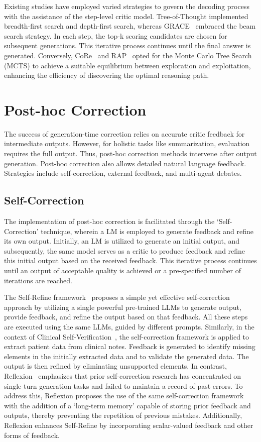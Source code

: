 \documentclass[a4paper,oneside]{book}
\begin{document}
Existing studies have employed varied strategies to govern the decoding process with the assistance of the step-level critic model. Tree-of-Thought implemented breadth-first search and depth-first search, whereas GRACE~\cite{khalifa2023grace} embraced the beam search strategy. In each step, the top-k scoring candidates are chosen for subsequent generations. This iterative process continues until the final answer is generated. Conversely, CoRe~\cite{zhu2022solving} and RAP~\cite{hao2023reasoning} opted for the Monte Carlo Tree Search (MCTS) to achieve a suitable equilibrium between exploration and exploitation, enhancing the efficiency of discovering the optimal reasoning path.

\section{Post-hoc Correction}
The success of generation-time correction relies on accurate critic feedback for intermediate outputs. However, for holistic tasks like summarization, evaluation requires the full output. Thus, post-hoc correction methods intervene after output generation. Post-hoc correction also allows detailed natural language feedback. Strategies include self-correction, external feedback, and multi-agent debates.

\subsection{Self-Correction}
The implementation of post-hoc correction is facilitated through the `Self-Correction' technique, wherein a LM is employed to generate feedback and refine its own output. Initially, an LM is utilized to generate an initial output, and subsequently, the same model serves as a critic to produce feedback and refine this initial output based on the received feedback. This iterative process continues until an output of acceptable quality is achieved or a pre-specified number of iterations are reached.

The Self-Refine framework~\cite{madaan2024self} proposes a simple yet effective self-correction approach by utilizing a single powerful pre-trained LLMs to generate output, provide feedback, and refine the output based on that feedback. All these steps are executed using the same LLMs, guided by different prompts. Similarly, in the context of Clinical Self-Verification~\cite{gero2023selfverification}, the self-correction framework is applied to extract patient data from clinical notes. Feedback is generated to identify missing elements in the initially extracted data and to validate the generated data. The output is then refined by eliminating unsupported elements. In contrast, Reflexion~\cite{shinn2023reflexion} emphasizes that prior self-correction research has concentrated on single-turn generation tasks and failed to maintain a record of past errors. To address this, Reflexion proposes the use of the same self-correction framework with the addition of a `long-term memory' capable of storing prior feedback and outputs, thereby preventing the repetition of previous mistakes. Additionally, Reflexion enhances Self-Refine by incorporating scalar-valued feedback and other forms of feedback.
\end{document}
